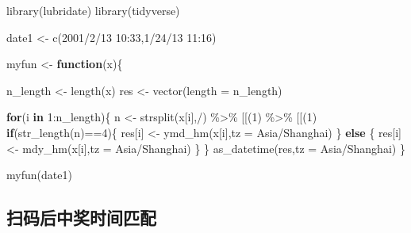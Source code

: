 \documentclass[
]{book}
\newenvironment{Shaded}{\begin{snugshade}}{\end{snugshade}}
\newcommand{\AttributeTok}[1]{\textcolor[rgb]{0.77,0.63,0.00}{#1}}
\newcommand{\ControlFlowTok}[1]{\textcolor[rgb]{0.13,0.29,0.53}{\textbf{#1}}}
\newcommand{\DecValTok}[1]{\textcolor[rgb]{0.00,0.00,0.81}{#1}}
\newcommand{\FunctionTok}[1]{\textcolor[rgb]{0.00,0.00,0.00}{#1}}
\newcommand{\NormalTok}[1]{#1}
\newcommand{\OtherTok}[1]{\textcolor[rgb]{0.56,0.35,0.01}{#1}}
\newcommand{\SpecialCharTok}[1]{\textcolor[rgb]{0.00,0.00,0.00}{#1}}
\newcommand{\StringTok}[1]{\textcolor[rgb]{0.31,0.60,0.02}{#1}}
\begin{document}
\begin{Shaded}
\begin{Highlighting}[]

\FunctionTok{library}\NormalTok{(lubridate)}
\FunctionTok{library}\NormalTok{(tidyverse)}

\NormalTok{date1 }\OtherTok{\textless{}{-}} \FunctionTok{c}\NormalTok{(}\StringTok{\textquotesingle{}2001/2/13 10:33\textquotesingle{}}\NormalTok{,}\StringTok{\textquotesingle{}1/24/13 11:16\textquotesingle{}}\NormalTok{)}

\NormalTok{myfun }\OtherTok{\textless{}{-}} \ControlFlowTok{function}\NormalTok{(x)\{}
  
\NormalTok{  n\_length }\OtherTok{\textless{}{-}} \FunctionTok{length}\NormalTok{(x)}
\NormalTok{  res }\OtherTok{\textless{}{-}} \FunctionTok{vector}\NormalTok{(}\AttributeTok{length =}\NormalTok{ n\_length)}
  
  \ControlFlowTok{for}\NormalTok{(i }\ControlFlowTok{in} \DecValTok{1}\SpecialCharTok{:}\NormalTok{n\_length)\{}
\NormalTok{    n }\OtherTok{\textless{}{-}} \FunctionTok{strsplit}\NormalTok{(x[i],}\StringTok{\textquotesingle{}/\textquotesingle{}}\NormalTok{) }\SpecialCharTok{\%\textgreater{}\%} \StringTok{\textasciigrave{}}\AttributeTok{[[}\StringTok{\textasciigrave{}}\NormalTok{(}\DecValTok{1}\NormalTok{) }\SpecialCharTok{\%\textgreater{}\%} \StringTok{\textasciigrave{}}\AttributeTok{[[}\StringTok{\textasciigrave{}}\NormalTok{(}\DecValTok{1}\NormalTok{)}
    \ControlFlowTok{if}\NormalTok{(}\FunctionTok{str\_length}\NormalTok{(n)}\SpecialCharTok{==}\DecValTok{4}\NormalTok{)\{}
\NormalTok{      res[i] }\OtherTok{\textless{}{-}} \FunctionTok{ymd\_hm}\NormalTok{(x[i],}\AttributeTok{tz =} \StringTok{\textquotesingle{}Asia/Shanghai\textquotesingle{}}\NormalTok{)}
\NormalTok{    \} }\ControlFlowTok{else}\NormalTok{ \{}
\NormalTok{      res[i] }\OtherTok{\textless{}{-}} \FunctionTok{mdy\_hm}\NormalTok{(x[i],}\AttributeTok{tz =} \StringTok{\textquotesingle{}Asia/Shanghai\textquotesingle{}}\NormalTok{)}
\NormalTok{    \}}
\NormalTok{  \}}
  \FunctionTok{as\_datetime}\NormalTok{(res,}\AttributeTok{tz =} \StringTok{\textquotesingle{}Asia/Shanghai\textquotesingle{}}\NormalTok{)}
\NormalTok{\}}

\FunctionTok{myfun}\NormalTok{(date1)}
\end{Highlighting}
\end{Shaded}

\hypertarget{ux626bux7801ux540eux4e2dux5956ux65f6ux95f4ux5339ux914d}{%
\subsection{扫码后中奖时间匹配}\label{ux626bux7801ux540eux4e2dux5956ux65f6ux95f4ux5339ux914d}}
\end{document}
